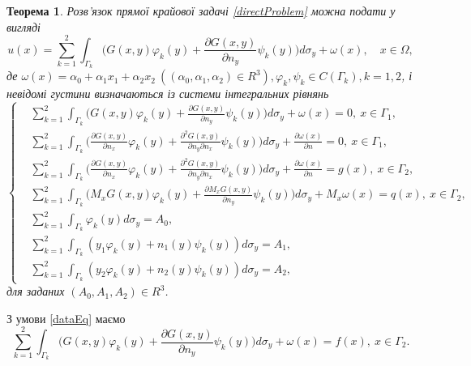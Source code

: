 \documentclass[12pt]{report}
\newtheorem{theorem}{Теорема}
\begin{document}
\begin{theorem}
Розв'язок прямої крайової задачі \eqref{directProblem} можна подати у вигляді
	 \begin{equation}
	 	u(x)=\sum_{k=1}^{2}\int_{\Gamma_k}\bigg(G(x,y)\varphi_k(y)+\frac{\partial G(x,y)}{\partial n_y}\psi_k(y)\bigg)d\sigma_y+\omega(x), \quad x\in \Omega,
	 \end{equation}
	 де $\omega(x) = \alpha_0+\alpha_1x_1+\alpha_2x_2 \ ((\alpha_0,\alpha_1,\alpha_2)\in R^3), \varphi_k,\psi_k\in C(\Gamma_k), k=1,2$, і невідомі густини визначаються із системи інтегральних рівнянь
	 \begin{equation}
	 \left\{
	 	\begin{split}
		\label{system}
	 		&\sum_{k=1}^{2}\int_{\Gamma_k}\bigg(G(x,y)\varphi_k(y)+\frac{\partial G(x,y)}{\partial n_y}\psi_k(y)\bigg)d\sigma_y+\omega(x)=0, \ x\in\Gamma_1, \\
			&\sum_{k=1}^{2}\int_{\Gamma_k}\bigg(\frac{\partial G(x,y)}{\partial n_x}\varphi_k(y)+\frac{\partial^2 G(x,y)}{\partial n_y\partial n_x}\psi_k(y)\bigg)d\sigma_y+\frac{\partial\omega(x)}{\partial n}=0, \ x\in\Gamma_1, \\
			&\sum_{k=1}^{2}\int_{\Gamma_k}\bigg(\frac{\partial G(x,y)}{\partial n_x}\varphi_k(y)+\frac{\partial^2 G(x,y)}{\partial n_y\partial n_x}\psi_k(y)\bigg)d\sigma_y+\frac{\partial\omega(x)}{\partial n}=g(x), \ x\in\Gamma_2, \\
			&\sum_{k=1}^{2}\int_{\Gamma_k}\bigg(M_x G(x,y)\varphi_k(y)+\frac{\partial M_x G(x,y)}{\partial n_y}\psi_k(y)\bigg)d\sigma_y+M_x\omega(x)=q(x), \ x\in\Gamma_2, \\
			&\sum_{k=1}^{2}\int_{\Gamma_k}\varphi_k(y)d\sigma_y=A_0, \\
			&\sum_{k=1}^{2}\int_{\Gamma_k}(y_1\varphi_k(y)+n_1(y)\psi_k(y))d\sigma_y=A_1, \\
			&\sum_{k=1}^{2}\int_{\Gamma_k}(y_2\varphi_k(y)+n_2(y)\psi_k(y))d\sigma_y=A_2,
		\end{split}
	\right.
	 \end{equation}
	для заданих $(A_0,A_1,A_2)\in R^3$.
 \end{theorem}
 
 З умови \eqref{dataEq} маємо
 \begin{equation}
 \label{dataEq1}
	\sum_{k=1}^{2}\int_{\Gamma_k}\bigg(G(x,y)\varphi_k(y)+\frac{\partial G(x,y)}{\partial n_y}\psi_k(y)\bigg)d\sigma_y+\omega(x)=f(x), \ x\in\Gamma_2.
 \end{equation}
 
\end{document}
